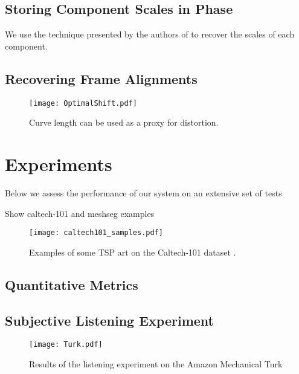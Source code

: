 \documentclass[runningheads]{llncs}
\begin{document}
\subsection{Storing Component Scales in Phase}
\label{sec:componentscales}

We use the technique presented by the authors of \cite{xiaoxiao_dong_data_2004} to recover the scales of each component.

\subsection{Recovering Frame Alignments}


\begin{figure}
  \centering
  \texttt{[image: OptimalShift.pdf]}
  \caption{Curve length can be used as a proxy for distortion.}
  \label{fig:TSPTour}
\end{figure}



\section{Experiments}
\label{sec:experiments}

Below we assess the performance of our system on an extensive set of tests

Show caltech-101 and meshseg examples

\begin{figure}
  \centering
  \texttt{[image: caltech101\_samples.pdf]}
  \caption{Examples of some TSP art on the Caltech-101 dataset \cite{li_andreeto_ranzato_perona_2022}.}
  \label{fig:caltech101examples}
\end{figure}

\subsection{Quantitative Metrics}

\subsection{Subjective Listening Experiment}

\begin{figure}
  \centering
  \texttt{[image: Turk.pdf]}
  \caption{Results of the listening experiment on the Amazon Mechanical Turk}
  \label{fig:TurkResults}
\end{figure}
\end{document}
